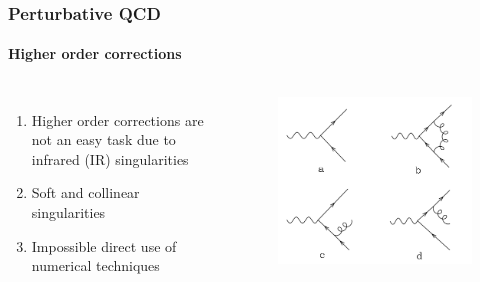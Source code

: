 \documentclass[aspectratio=43]{beamer}
\begin{document}
\begin{frame}

	\frametitle{Perturbative QCD}
	\framesubtitle{Higher order corrections}
	\begin{columns}
	
	
	\begin{enumerate}
		\item Higher order corrections are {\color{red}not an easy task} due to {\color{red} infrared (IR) singularities}
		\item Soft and collinear singularities
		\item Impossible direct use of numerical techniques
	\end{enumerate}
	
	\begin{figure}[!htb]
		\includegraphics[width = \linewidth]{plots/qcd_corrections.png}
	\end{figure}
	
	\end{columns}

\end{frame}
\end{document}

